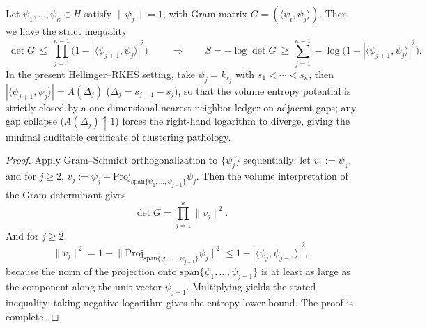 \begin{proposition}\label{prop:xi-gram-det-nearest-neighbor-product-upper-bound}
Let \(\psi_1,\dots,\psi_\kappa\in H\) satisfy \(\|\psi_j\|=1\), with Gram matrix \(G=(\langle\psi_i,\psi_j\rangle)\).
Then we have the strict inequality
\[
\boxed{\;
\det G\ \le\ \prod_{j=1}^{\kappa-1}\bigl(1-|\langle\psi_{j+1},\psi_j\rangle|^2\bigr)\;}
\qquad
\Longrightarrow\qquad
S=-\log\det G\ \ge\ \sum_{j=1}^{\kappa-1}-\log\bigl(1-|\langle\psi_{j+1},\psi_j\rangle|^2\bigr).
\]
In the present Hellinger--RKHS setting, take \(\psi_j=k_{s_j}\) with \(s_1<\cdots<s_\kappa\), then \(|\langle\psi_{j+1},\psi_j\rangle|=A(\Delta_j)\) (\(\Delta_j=s_{j+1}-s_j\)), so that the volume entropy potential is strictly closed by a one-dimensional nearest-neighbor ledger on adjacent gaps; any gap collapse (\(A(\Delta_j)\uparrow 1\)) forces the right-hand logarithm to diverge, giving the minimal auditable certificate of clustering pathology.
\end{proposition}
\begin{proof}
Apply Gram--Schmidt orthogonalization to \(\{\psi_j\}\) sequentially: let
\(
v_1:=\psi_1
\), and for \(j\ge 2\),
\(
v_j:=\psi_j-\mathrm{Proj}_{\mathrm{span}\{\psi_1,\dots,\psi_{j-1}\}}\psi_j
\).
Then the volume interpretation of the Gram determinant gives
\[
\det G=\prod_{j=1}^{\kappa}\|v_j\|^2.
\]
And for \(j\ge 2\),
\[
\|v_j\|^2=1-\bigl\|\mathrm{Proj}_{\mathrm{span}\{\psi_1,\dots,\psi_{j-1}\}}\psi_j\bigr\|^2
\le 1-|\langle\psi_j,\psi_{j-1}\rangle|^2,
\]
because the norm of the projection onto \(\mathrm{span}\{\psi_1,\dots,\psi_{j-1}\}\) is at least as large as the component along the unit vector \(\psi_{j-1}\).
Multiplying yields the stated inequality; taking negative logarithm gives the entropy lower bound. The proof is complete.
\end{proof}

